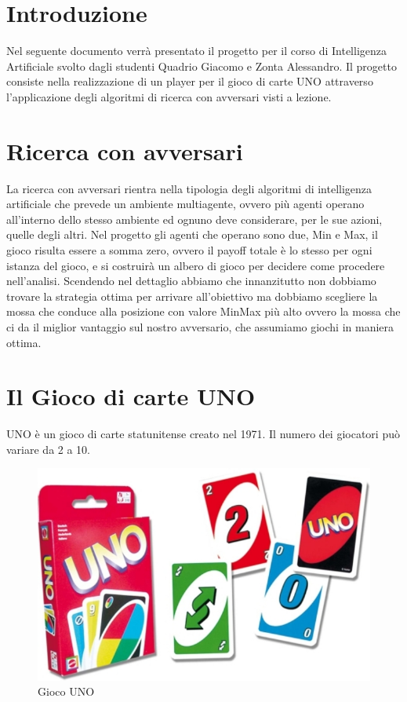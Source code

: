 \tableofcontents

\newpage
\section{Introduzione}
	Nel seguente documento verrà presentato il progetto per il corso di Intelligenza Artificiale svolto dagli studenti Quadrio Giacomo e Zonta Alessandro.  Il progetto consiste nella realizzazione di un player per il gioco di carte UNO attraverso l’applicazione degli algoritmi di ricerca con avversari visti a lezione.
\newpage

\section{Ricerca con avversari}
	La ricerca con avversari rientra nella tipologia degli algoritmi di intelligenza artificiale che prevede un ambiente multiagente, ovvero più agenti operano all’interno dello stesso ambiente ed ognuno deve considerare, per le sue azioni, quelle degli altri. Nel progetto gli agenti che operano sono due, Min e Max, il gioco risulta essere a somma zero, ovvero il payoff totale è lo stesso per ogni istanza del gioco, e si costruirà un albero di gioco per decidere come procedere nell’analisi. Scendendo nel dettaglio abbiamo che innanzitutto non dobbiamo trovare la strategia ottima per arrivare all’obiettivo ma dobbiamo scegliere la mossa che conduce alla posizione con valore MinMax più alto ovvero la mossa che ci da il miglior vantaggio sul nostro avversario, che assumiamo giochi in maniera ottima. 
\newpage

\section{Il Gioco di carte UNO}
	UNO è un gioco di carte statunitense creato nel 1971. Il numero dei giocatori può variare da 2 a 10. 
	\begin{figure}[h]
		\centering
		\includegraphics[scale=1]{uno.jpg}
		\caption{Gioco UNO}
		\label{fig0}
	\end{figure}
	
